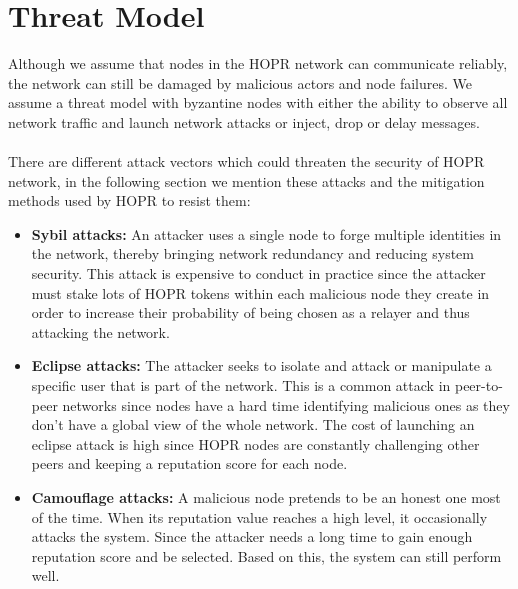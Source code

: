 \section{Threat Model}

Although we assume that nodes in the HOPR network can communicate reliably, the
network can still be damaged by malicious actors and node failures. We assume a
threat model with byzantine nodes with either the ability to observe all network
traffic and launch network attacks or inject, drop or delay messages. \\~\\There
are different attack vectors which could threaten the security of HOPR network,
in the following section we mention these attacks and the mitigation methods
used by HOPR to resist them:

\begin{itemize}
    \item \textbf{Sybil attacks:} An attacker uses a single node to forge
    multiple identities in the network, thereby bringing network redundancy and
    reducing system security. This attack is expensive to conduct in practice since
    the attacker must stake lots of HOPR tokens within each malicious node they
    create in order to increase their probability of being chosen as a relayer and
    thus attacking the network.
    \item \textbf{Eclipse attacks:} The attacker seeks to isolate and attack or
    manipulate a specific user that is part of the network. This is a common
    attack in peer-to-peer networks since nodes have a hard time identifying
    malicious ones as they don't have a global view of the whole network. The cost
    of launching an eclipse attack is high since HOPR nodes are constantly
    challenging other peers and keeping a reputation score for each node.
    \item \textbf{Camouflage attacks:} A malicious node pretends to be an honest
    one most of the time. When its reputation value reaches a high level, it
    occasionally attacks the system. Since the attacker needs a long time to gain
    enough reputation score and be selected. Based on this, the system can still
    perform well.
    
\end{itemize}
